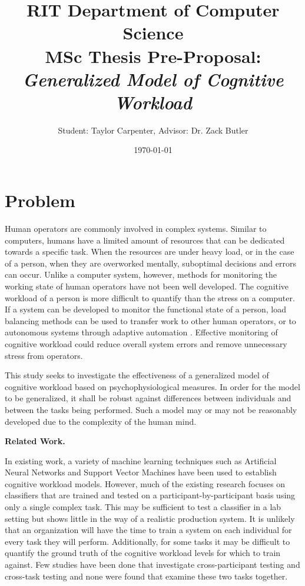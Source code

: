 \documentclass[11pt]{artikel3}
\title{RIT Department of Computer Science\\MSc Thesis Pre-Proposal:\\\emph{Generalized Model of Cognitive Workload}}
\author{Student: Taylor Carpenter, Advisor: Dr. Zack Butler}
\date{\today}
\begin{document}
\maketitle

\section{Problem}

Human operators are commonly involved in complex systems. Similar to computers, humans have a limited amount of resources that can be dedicated towards a specific task. When the resources are under heavy load, or in the case of a person, when they are overworked mentally, suboptimal decisions and errors can occur. Unlike a computer system, however, methods for monitoring the working state of human operators have not been well developed. The cognitive workload of a person is more difficult to quantify than the stress on a computer. If a system can be developed to monitor the functional state of a person, load balancing methods can be used to transfer work to other human operators, or to autonomous systems through adaptive automation \cite{wilson_operator_2005}. Effective monitoring of cognitive workload could reduce overall system errors and remove unnecessary stress from operators.

This study seeks to investigate the effectiveness of a generalized model of cognitive workload based on psychophysiological measures. In order for the model to be generalized, it shall be robust against differences between individuals and between the tasks being performed. Such a model may or may not be reasonably developed due to the complexity of the human mind.
 
{\bf Related Work.}

In existing work, a variety of machine learning techniques such as Artificial Neural Networks \cite{wilson_real-time_2003} and Support Vector Machines \cite{yin_operator_2014} have been used to establish cognitive workload models. However, much of the existing research focuses on classifiers that are trained and tested on a participant-by-participant basis using only a single complex task. This may be sufficient to test a classifier in a lab setting but shows little in the way of a realistic production system. It is unlikely that an organization will have the time to train a system on each individual for every task they will perform. Additionally, for some tasks it may be difficult to quantify the ground truth of the cognitive workload levels for which to train against. Few studies have been done that investigate cross-participant testing \cite{wang_cross-subject_2012} and cross-task testing \cite{ke_eeg-based_2014} and none were found that examine these two tasks together.
\end{document}
